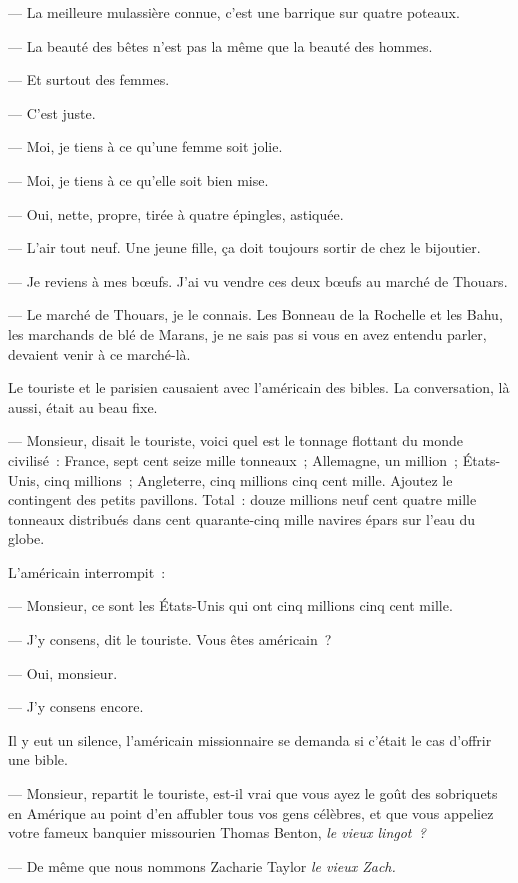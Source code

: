 \documentclass[french,twoside]{book} %
\begin{document}
— La meilleure mulassière connue, c’est une barrique sur quatre poteaux.\par
— La beauté des bêtes n’est pas la même que la beauté des hommes.\par
 — Et surtout des femmes.\par
— C’est juste.\par
— Moi, je tiens à ce qu’une femme soit jolie.\par
— Moi, je tiens à ce qu’elle soit bien mise.\par
— Oui, nette, propre, tirée à quatre épingles, astiquée.\par
— L’air tout neuf. Une jeune fille, ça doit toujours sortir de chez le bijoutier.\par
— Je reviens à mes bœufs. J’ai vu vendre ces deux bœufs au marché de Thouars.\par
— Le marché de Thouars, je le connais. Les Bonneau de la Rochelle et les Bahu, les marchands de blé de Marans, je ne sais pas si vous en avez entendu parler, devaient venir à ce marché-là.\par
Le touriste et le parisien causaient avec l’américain des bibles. La conversation, là aussi, était au beau fixe.\par
— Monsieur, disait le touriste, voici quel est le tonnage flottant du monde civilisé : France, sept cent seize mille tonneaux ; Allemagne, un million ; États-Unis, cinq millions ; Angleterre, cinq millions cinq cent mille. Ajoutez le contingent des petits pavillons. Total : douze millions neuf cent quatre mille tonneaux distribués dans cent quarante-cinq mille navires épars sur l’eau du globe.\par
L’américain interrompit :\par
— Monsieur, ce sont les États-Unis qui ont cinq millions cinq cent mille.\par
— J’y consens, dit le touriste. Vous êtes américain ?\par
 — Oui, monsieur.\par
— J’y consens encore.\par
Il y eut un silence, l’américain missionnaire se demanda si c’était le cas d’offrir une bible.\par
— Monsieur, repartit le touriste, est-il vrai que vous ayez le goût des sobriquets en Amérique au point d’en affubler tous vos gens célèbres, et que vous appeliez votre fameux banquier missourien Thomas Benton, \emph{le vieux lingot ?}\par
— De même que nous nommons Zacharie Taylor \emph{le vieux Zach.}\par
\end{document}
